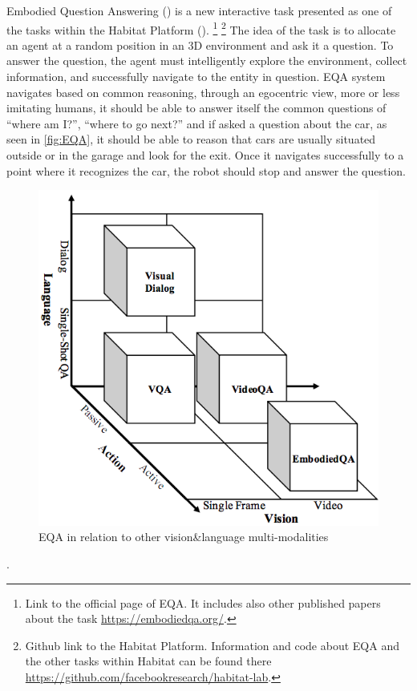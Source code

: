 Embodied Question Answering (\cite{embodiedqa}) is a new interactive task presented as one of the tasks within the Habitat Platform (\cite{embodiedqa}). \footnote{Link to the official page of EQA. It includes also other published papers about the task \url{https://embodiedqa.org/}.} \footnote{Github link to the Habitat Platform. Information and code about EQA and the other tasks within Habitat can be found there \url{https://github.com/facebookresearch/habitat-lab}.} The idea of the task is to allocate an agent at a random position in an  3D environment and ask it a question. To answer the question, the agent must intelligently explore the environment, collect information, and successfully navigate to the entity in question. EQA system navigates based on common reasoning, through an egocentric view, more or less imitating humans, it should be able to answer itself the common questions of “where am I?”, “where to go next?” and if asked a question about the car, as seen in \ref{fig:EQA}, it should be able to reason that cars are usually situated outside or in the garage and look for the exit. Once it navigates successfully to a point where it recognizes the car, the robot should stop and answer the question.  


\begin{figure}[H]
\centering
\includegraphics[scale=0.3]{images/Vision-language.png}
\caption{EQA in relation to other vision\&language multi-modalities}
\label{fig:multimodal}
\end{figure}.


